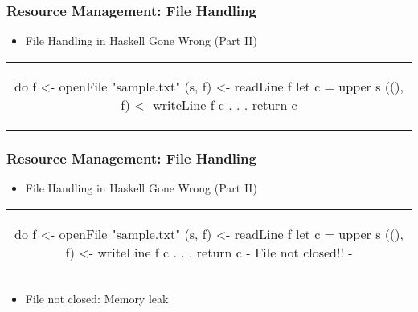 \begin{frame}[fragile, c]
  \frametitle{Resource Management: File Handling}
  \begin{center}

  \begin{itemize}
  \item File Handling in Haskell Gone Wrong (Part II)
  \end{itemize}
  \begin{tabular}[h]{c}
    \begin{haskell}
    do f  <- openFile "sample.txt"
       (s, f)  <- readLine f
       let c = upper s
       ((), f) <- writeLine f c
           .
           .
           .
       return c
     \end{haskell}
  \end{tabular}

\end{center}
\end{frame}

\begin{frame}[fragile, c]
  \frametitle{Resource Management: File Handling}
  \begin{center}

  \begin{itemize}
  \item File Handling in Haskell Gone Wrong (Part II)
  \end{itemize}
  \begin{tabular}[h]{c}
    \begin{haskell}
    do f  <- openFile "sample.txt"
       (s, f)  <- readLine f
       let c = upper s
       ((), f) <- writeLine f c
           .
           .
           .
       return c {- File not closed!! -}
     \end{haskell}
  \end{tabular}
  \begin{itemize}
  \item File not closed: Memory leak
  \end{itemize}
  \end{center}
\end{frame}

